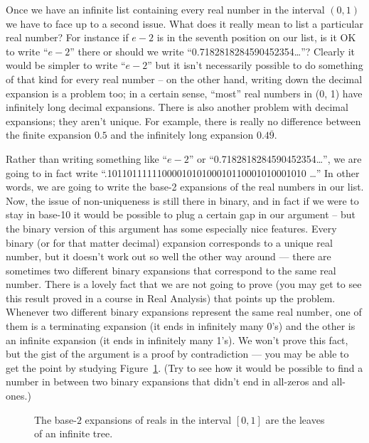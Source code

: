 Once we have an infinite list containing every real number in the interval
$(0, 1)$ we have to face up to a second issue. What does it really mean
to list a particular real number? For instance if $e-2$ is in the seventh
position on our list, is it OK to write ``$e-2$'' there or should we write
``0.7182818284590452354\ldots''?  Clearly it would be simpler to write 
``$e-2$'' but it isn't necessarily possible to do something of that kind 
for every real
number -- on the other hand, writing down the decimal expansion is a problem
too; in a certain sense, ``most'' real numbers in (0, 1) have infinitely long
decimal expansions.  There is also another problem with decimal expansions;
they aren't unique.  For example, there is really no difference between the
finite expansion $0.5$ and the infinitely long expansion  $0.4\overline{9}$.

Rather than writing something like ``$e-2$'' or ``0.7182818284590452354\ldots'',
we are going to in fact write ``.1011011111100001010100010110001010001010 \ldots''
In other words, we are going to write the base-2 expansions of the real numbers
in our list. Now, the issue of non-uniqueness is still there in binary, and
in fact if we were to stay in base-10 it would be possible to plug a certain
gap in our argument -- but the binary version of this argument has some
especially nice features.
Every binary (or for that matter decimal) expansion corresponds to a unique 
real number, but it doesn't work out so well the other way around ---
there are sometimes two different binary expansions that correspond to the
same real number. There is a lovely fact that we are not going to prove (you
may get to see this result proved in a course in Real Analysis) that points up
the problem. Whenever two different binary expansions represent the same
real number, one of them is a terminating expansion (it ends in infinitely
many 0's) and the other is an infinite expansion (it ends in infinitely many
1's). We won't prove this fact, but the gist of the argument is a proof by
contradiction --- you may be able to get the point by studying Figure~\ref{fig:binary_reps}.
(Try to see how it would be possible to find a number in between two binary
expansions that didn't end in all-zeros and all-ones.)

\begin{figure}[!hbtp]

\caption[Binary representations in the unit interval.]{The base-$2$ %
expansions of reals in the interval $[0, 1]$ are the leaves of an %
infinite tree.}
\label{fig:binary_reps} 
\end{figure}

